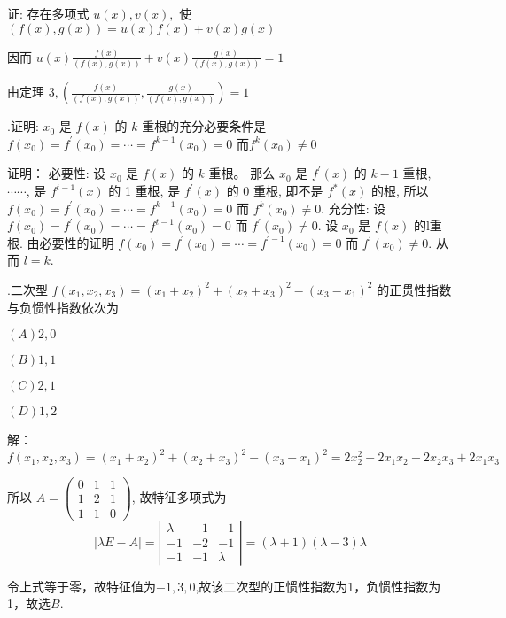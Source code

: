 \documentclass{article}
\begin{document}
证: 存在多项式 $u(x), v(x),$ 使 $(f(x), g(x))=u(x) f(x)+v(x) g(x)$

因而 $u(x) \frac{f(x)}{(f(x), g(x))}+v(x) \frac{g(x)}{(f(x), g(x))}=1$

由定理 $3, \left(\frac{f(x)}{(f(x),g(x))},\frac{g(x)}{(f(x), g(x))}\right)=1$

{.}证明: $x_{0}$ 是 $f(x)$ 的 $k$ 重根的充分必要条件是 $f\left(x_{0}\right)=f^{\prime}\left(x_{0}\right)=\cdots=f^{k-1}\left(x_{0}\right)=0$ 而$f^{k}\left(x_{0}\right) \neq 0$

证明： 必要性: 设 $x_{0}$ 是 $f(x)$ 的 $k$ 重根。 那么 $x_{0}$ 是 $f^{\prime}(x)$ 的 $k-1$ 重根, $\cdots \cdots$, 是 $f^{t-1}(x)$ 的
1 重根, 是 $f^{\prime}(x)$ 的 0 重根, 即不是 $f^{*}(x)$ 的根, 所以 $f\left(x_{0}\right)=f^{\prime}\left(x_{0}\right)=\cdots=f^{k-1}\left(x_{0}\right)=0$
而 $f^{k}\left(x_{0}\right) \neq 0 .$
充分性: 设 $f(x_{0})=f^{\prime}\left(x_{0}\right)=\cdots=f^{t-1}\left(x_{0}\right)=0$ 而 $f^{\prime}\left(x_{0}\right) \neq 0 .$ 设 $x_{0}$ 是 $f(x)$ 的l重根.
由必要性的证明 $f\left(x_{0}\right)=f^{\prime}\left(x_{0}\right)=\cdots=f^{\prime-1}\left(x_{0}\right)=0$ 而 $f^{\prime}\left(x_{0}\right) \neq 0 .$ 从而 $l=k .$


{.}二次型 $f\left(x_{1}, x_{2}, x_{3}\right)=\left(x_{1}+x_{2}\right)^{2}+\left(x_{2}+x_{3}\right)^{2}-\left(x_{3}-x_{1}\right)^{2}$ 的正贯性指数与负惯性指数依次为

$(A) 2,0 $

$(B) 1,1 $

$(C) 2,1 $

$(D) 1,2 $

解：$f\left(x_{1}, x_{2}, x_{3}\right)=\left(x_{1}+x_{2}\right)^{2}+\left(x_{2}+x_{3}\right)^{2}-\left(x_{3}-x_{1}\right)^{2}=2 x_{2}^{2}+2 x_{1} x_{2}+2 x_{2} x_{3}+2 x_{1} x_{3}$

所以 $A=\left(\begin{array}{lll}0 & 1 & 1 \\ 1 & 2 & 1 \\ 1 & 1 & 0\end{array}\right)$, 故特征多项式为
$$
    |\lambda E-A|=\left|\begin{array}{rrr}
        \lambda & -1 & -1      \\
        -1      & -2 & -1      \\
        -1      & -1 & \lambda
    \end{array}\right|=(\lambda+1)(\lambda-3) \lambda
$$

令上式等于零，故特征值为$-1,3,0$,故该二次型的正惯性指数为1，负惯性指数为1，故选$B$.\\
\end{document}

